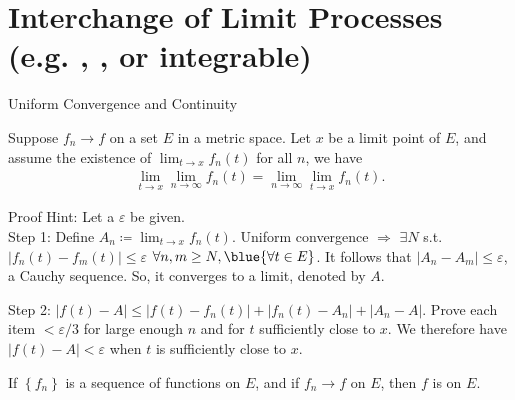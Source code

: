 \documentclass[10pt,xcolor=table,dvipsnames]{beamer}
\begin{document}
\section{Interchange of Limit Processes (e.g. , , or integrable)}

\begin{frame}{Uniform Convergence and Continuity}
\begin{Theorem}
    Suppose $f_n \rightarrow f$  on a set $E$ in a metric space. Let $x$ be a limit point of $E$, and assume the existence of $\lim _{t \rightarrow x} f_n(t)$ for all $n$, we have 
\begin{align*}
\lim _{t \rightarrow x} \lim _{n \rightarrow \infty} f_n(t)=\lim _{n \rightarrow \infty} \lim _{t \rightarrow x} f_n(t) .
\end{align*}
\end{Theorem}
\pause
{}

\pause
Proof Hint:
 Let a $\varepsilon$ be given.\\ 
Step 1: Define $A_n\coloneqq \lim _{t \rightarrow x} f_n(t)$. Uniform convergence $\Rightarrow$   $\exists N$ s.t.
$\left|f_n(t)-f_m(t)\right| \leq \varepsilon$ $\forall n, m \geq N, \blue{\forall t \in E}$.
It follows that
$\left|A_n-A_m\right| \leq \varepsilon$, a Cauchy sequence. So, it converges to a limit, denoted by $A$.

\pause
Step 2: $|f(t)-A| \leq\left|f(t)-f_n(t)\right|+\left|f_n(t)-A_n\right|+\left|A_n-A\right|$. Prove each item $< \varepsilon/3$ for large enough $n$ and for \( t \) sufficiently close to $x$. We therefore have $|f(t) - A| < \varepsilon$ when $t$ is sufficiently close to $x$.
\pause
\begin{Corollary}
 If $\left\{f_n\right\}$ is a sequence of  functions on $E$, and if $f_n \rightarrow f$  on $E$, then $f$ is  on $E$.
\end{Corollary}
\end{frame}
\end{document}
